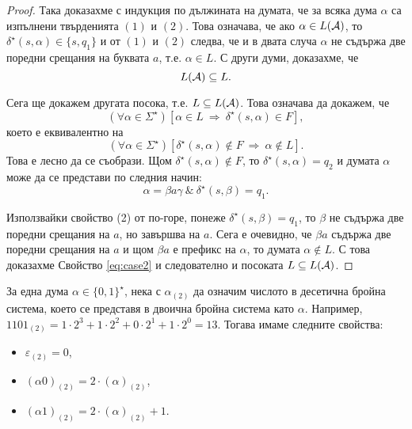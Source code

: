 \begin{proof}
 Така доказахме с индукция по дължината на думата, че за всяка дума $\alpha$
 са  изпълнени твърденията $(1)$ и $(2)$. Това означава, че ако $\alpha \in L(\mathcal{A})$,
 то $\delta^\star(s,\alpha) \in \{s,q_1\}$ и от $(1)$ и $(2)$ следва, че и в двата случа
 $\alpha$ не съдържа две поредни срещания на буквата $a$, т.е. $\alpha \in L$.
 С други думи, доказахме, че 
 \[L(\mathcal{A}) \subseteq L.\]

 Сега ще докажем другата посока, т.е. $L \subseteq L(\mathcal{A})$.
 Това означава да докажем, че
 \[(\forall \alpha \in \Sigma^\star)[\alpha \in L\ \Rightarrow\ \delta^\star(s,\alpha) \in F],\]
 което е еквивалентно на
 \begin{equation}
   \label{eq:case2}
   (\forall \alpha \in \Sigma^\star)[\delta^\star(s,\alpha) \not\in F \ \Rightarrow\ \alpha\not\in L].
 \end{equation}
 Това е лесно да се съобрази.
 Щом $\delta^\star(s,\alpha) \not\in F$, то 
 $\delta^\star(s,\alpha) = q_2$ и думата $\alpha$ може да се представи по следния начин:
 \[\alpha = \beta a \gamma\ \&\ \delta^\star(s,\beta) = q_1.\]
 
 Използвайки свойство (2) от по-горе, понеже $\delta^\star(s,\beta) = q_1$, то
 $\beta$ не съдържа две поредни срещания на $a$, но завършва на $a$.
 Сега е очевидно, че $\beta a$ съдържа две поредни срещания на $a$ и 
 щом $\beta a$ е префикс на $\alpha$, то думата $\alpha \not\in L$.
 С това доказахме Свойство \ref{eq:case2} и следователно и посоката $L\subseteq L(\mathcal{A})$.
\end{proof}

\begin{framed}
  За една дума $\alpha \in \{0,1\}^\star$, 
  нека с $\alpha_{(2)}$ да означим числото в десетична бройна система, което се представя в двоична бройна система като $\alpha$.
  Например, $1101_{(2)} = 1 \cdot 2^3+1\cdot 2^2+0\cdot 2^1+1\cdot 2^0 = 13$.
  Тогава имаме следните свойства:
  \begin{itemize}
  \item
    $\varepsilon_{(2)} = 0$,
  \item
    $(\alpha0)_{(2)} = 2\cdot(\alpha)_{(2)}$,
  \item
    $(\alpha1)_{(2)} = 2\cdot(\alpha)_{(2)} + 1$.
  \end{itemize}
\end{framed}

